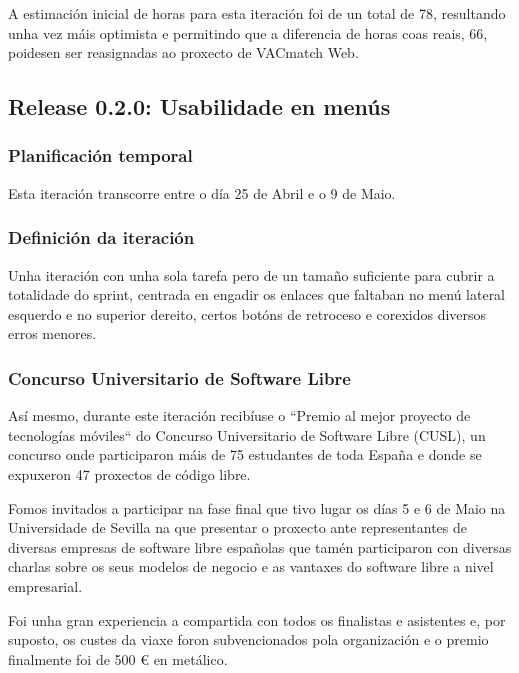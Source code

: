     A estimación inicial de horas para esta iteración foi de un total de 78, 
resultando unha vez máis optimista e permitindo que a diferencia de horas coas 
reais, 66, poidesen ser reasignadas ao proxecto de VACmatch Web.

    \subsection{Release 0.2.0: Usabilidade en menús}

      \subsubsection{Planificación temporal}
      Esta iteración transcorre entre o día 25 de Abril e o 9 de Maio.

      \subsubsection{Definición da iteración}
      Unha iteración con unha sola tarefa pero de un tamaño suficiente para 
cubrir a totalidade do sprint, centrada en engadir os enlaces que faltaban no 
menú lateral esquerdo e no superior dereito, certos botóns de retroceso e 
corexidos diversos erros menores.

      \subsubsection{Concurso Universitario de Software Libre}
      Así mesmo, durante este iteración recibíuse o ``Premio al mejor proyecto 
de tecnologías móviles`` do Concurso Universitario de Software Libre (CUSL), un 
concurso onde participaron máis de 75 estudantes de toda España e donde se 
expuxeron 47 proxectos de código libre.

      Fomos invitados a participar na fase final que tivo lugar os días 5 e 6 
de Maio na Universidade de Sevilla na que presentar o proxecto ante 
representantes de diversas empresas de software libre españolas que tamén 
participaron con diversas charlas sobre os seus modelos de negocio e as 
vantaxes do software libre a nivel empresarial.

      Foi unha gran experiencia a compartida con todos os finalistas e 
asistentes e, por suposto, os custes da viaxe foron subvencionados pola 
organización e o premio finalmente foi de 500 \euro{} en metálico.

